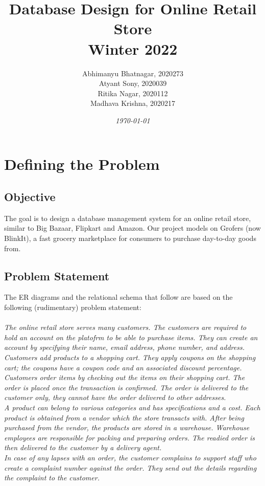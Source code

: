 \documentclass[12pt]{report}
\title{
    \textbf{Database Design for Online Retail Store\\ Winter 2022 \\}
}
\author{Abhimanyu Bhatnagar, 2020273
        \\Atyant Sony, 2020039
        \\Ritika Nagar, 2020112
        \\Madhava Krishna, 2020217}
\date{\textit{\today}}
\begin{document}
    \maketitle
    
    \tableofcontents
    \listoffigures
    \pagebreak

    \chapter{Defining the Problem}
    \section{Objective}
        The goal is to design a database management system for an online retail store,
        similar to Big Bazaar, Flipkart and Amazon. Our project models on Grofers (now BlinkIt), 
        a fast grocery marketplace for consumers to purchase day-to-day goods from.
    
    \section{Problem Statement}
    The ER diagrams and the relational schema that follow are based on the following (rudimentary) problem statement:
    \\\\
    \textit{
        The online retail store serves many customers. 
        The customers are required to hold an account on the platofrm to be able to purchase items.
        They can create an account by specifying their name, email address, phone number, and address.
        Customers add products to a shopping cart. They apply coupons on the shopping cart; the coupons 
        have a coupon code and an associated discount percentage.\\
        Customers order items by checking out the items on their shopping cart. The order is placed once the
         transaction is confirmed. The order is delivered to the customer only, 
         they cannot have the order delivered to other addresses.
        \\
        A product can belong to various categories and has specifications and a cost. Each
        product is obtained from a vendor which the store transacts with. After being purchased from 
        the vendor, the products are stored in a warehouse. Warehouse employees are responsible for packing 
        and preparing orders. The readied order is then delivered to the customer by a delivery agent.
        \\
        In case of any lapses with an order, the customer complains to support staff who create a complaint
        number against the order. They send out the details regarding the complaint to the customer.
    }
    
\end{document}

